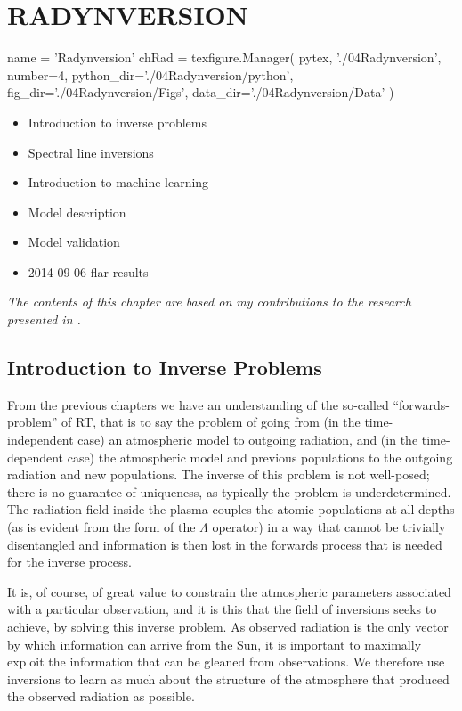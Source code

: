 \chapter{RADYNVERSION}\label{Chap:Radynversion}

\begin{pycode}[Radynversion]
name = 'Radynversion'
chRad = texfigure.Manager(
    pytex,
    './04Radynversion',
    number=4,
    python_dir='./04Radynversion/python',
    fig_dir='./04Radynversion/Figs',
    data_dir='./04Radynversion/Data'
)
\end{pycode}

\begin{itemize}
    \item Introduction to inverse problems
    \item Spectral line inversions
    \item Introduction to machine learning
    \item Model description
    \item Model validation
    \item 2014-09-06 flar results
\end{itemize}

\emph{The contents of this chapter are based on my contributions to the research presented in \citet{Osborne2019}.}



\section{Introduction to Inverse Problems}

From the previous chapters we have an understanding of the so-called ``forwards-problem'' of RT, that is to say the problem of going from (in the time-independent case) an atmospheric model to outgoing radiation, and (in the time-dependent case) the atmospheric model and previous populations to the outgoing radiation and new populations.
The inverse of this problem is not well-posed; there is no guarantee of uniqueness, as typically the problem is underdetermined.
The radiation field inside the plasma couples the atomic populations at all depths (as is evident from the form of the $\Lambda$ operator) in a way that cannot be trivially disentangled and information is then lost in the forwards process that is needed for the inverse process.

It is, of course, of great value to constrain the atmospheric parameters associated with a particular observation, and it is this that the field of inversions seeks to achieve, by solving this inverse problem. As observed radiation is the only vector by which information can arrive from the Sun, it is important to maximally exploit the information that can be gleaned from observations. We therefore use inversions to learn as much about the structure of the atmosphere that produced the observed radiation as possible.

